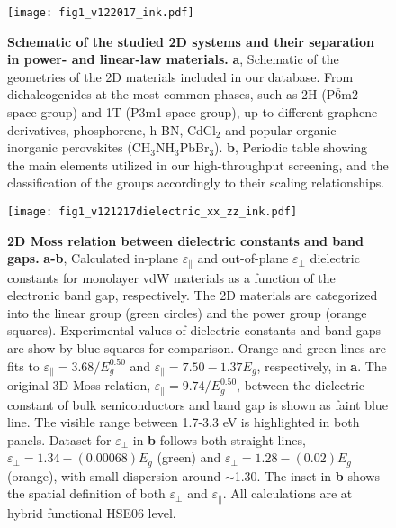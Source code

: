 \documentclass[journal=ancac3,manuscript=article,email=true,hyperref=true,keywords=true]{achemso}
\begin{document}


\pagebreak{}




\label{sec:org01da3bf}

\begin{figure}[htbp]
\centering
\texttt{[image: fig1\_v122017\_ink.pdf]}
\caption{\label{fig-1} {\bf Schematic of the studied 2D systems 
and their separation in power- and linear-law materials.}
{\bf a}, Schematic of the geometries of the 2D materials included in our database. 
From dichalcogenides at the most common phases, such as  
2H (P\(\bar{6}\)m2 space group) and 1T (P3m1 space group), up to different graphene derivatives, phosphorene, h-BN, CdCl$_2$ and popular organic-inorganic perovskites (CH$_3$NH$_3$PbBr$_3$). 
{\bf b}, Periodic table showing the main elements utilized in our high-throughput screening, and the classification of the groups accordingly to their scaling relationships. 
}
\end{figure}


\begin{figure}[htbp]
\centering
\texttt{[image: fig1\_v121217dielectric\_xx\_zz\_ink.pdf]}
\caption{\label{fig-2} {\bf 2D Moss relation between dielectric constants and band gaps.} 
{\bf a-b}, Calculated in-plane $\varepsilon_{\parallel}$ and out-of-plane $\varepsilon_{\perp}$  
dielectric constants for monolayer vdW materials as a function of the electronic band gap, respectively. 
The 2D materials are categorized into the linear group (green circles) and the 
power group (orange squares). Experimental values of dielectric 
constants and band gaps are show by 
blue squares for comparison\cite{BN-epsilon,Mos2-epsilon,Chernikov_2014_EB_MoS2_2D3D,In2Se3-epsilon}. 
Orange and green lines are fits to $\varepsilon_{\parallel}=3.68/E_{g}^{0.50}$ and 
$\varepsilon_{\parallel}=7.50-1.37E_{g}$, respectively, in {\bf a}. The original 3D-Moss relation, $\varepsilon_{\parallel}=9.74/E_{g}^{0.50}$, between the dielectric constant of bulk semiconductors and band gap is shown as faint blue line. The visible range between 1.7-3.3 eV is highlighted in both panels. 
Dataset for $\varepsilon_{\perp}$ in {\bf b} follows both straight lines, 
$\varepsilon_{\perp}=1.34-(0.00068)E_{g}$ (green) and $\varepsilon_{\perp}=1.28-(0.02)E_{g}$ (orange), 
with small dispersion around $\sim$1.30. The inset in {\bf b} shows the spatial definition of both $\varepsilon_{\perp}$ and $\varepsilon_{\parallel}$. All calculations are at hybrid functional HSE06 level. 
}
\end{figure}
\end{document}
